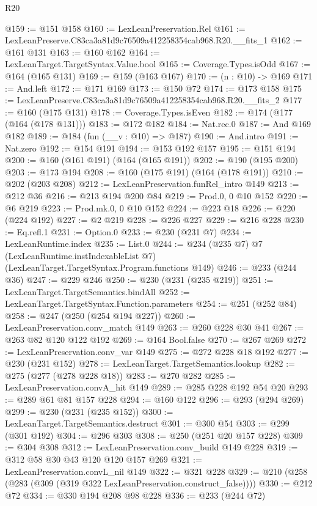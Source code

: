 \begin{lexlean}{R20}
\begin{coremodule}
@159 := @151 @158
@160 := LexLeanPreservation.Rel
@161 := LexLeanPreserve.C83ca3a81d9c76509a412258354cab968.R20.__fits_1
@162 := @161 @131
@163 := @160 @162
@164 := LexLeanTarget.TargetSyntax.Value.bool
@165 := Coverage.Types.isOdd
@167 := @164 (@165 @131)
@169 := @159 (@163 @167)
@170 := (n : @10) -> @169
@171 := And.left
@172 := @171 @169
@173 := @150 @72
@174 := @173 @158
@175 := LexLeanPreserve.C83ca3a81d9c76509a412258354cab968.R20.__fits_2
@177 := @160 (@175 @131)
@178 := Coverage.Types.isEven
@182 := @174 (@177 (@164 (@178 @131)))
@183 := @172 @182
@184 := Nat.rec.{0}
@187 := And @169 @182
@189 := @184 (fun (__v : @10) => @187)
@190 := And.intro
@191 := Nat.zero
@192 := @154 @191
@194 := @153 @192 @157
@195 := @151 @194
@200 := @160 (@161 @191) (@164 (@165 @191))
@202 := @190 (@195 @200)
@203 := @173 @194
@208 := @160 (@175 @191) (@164 (@178 @191))
@210 := @202 (@203 @208)
@212 := LexLeanPreservation.funRel_intro @149
@213 := @212 @36
@216 := @213 @194 @200 @84
@219 := Prod.{0, 0} @10 @152
@220 := @6 @219
@223 := Prod.mk.{0, 0} @10 @152
@224 := @223 @18
@226 := @220 (@224 @192)
@227 := @2 @219
@228 := @226 @227
@229 := @216 @228
@230 := Eq.refl.{1}
@231 := Option.{0}
@233 := @230 (@231 @7)
@234 := LexLeanRuntime.index
@235 := List.{0}
@244 := @234
    (@235 @7)
    @7
    (LexLeanRuntime.instIndexableList @7)
    (LexLeanTarget.TargetSyntax.Program.functions @149)
@246 := @233 (@244 @36)
@247 := @229 @246
@250 := @230 (@231 (@235 @219))
@251 := LexLeanTarget.TargetSemantics.bindAll
@252 := LexLeanTarget.TargetSyntax.Function.parameters
@254 := @251 (@252 @84)
@258 := @247 (@250 (@254 @194 @227))
@260 := LexLeanPreservation.conv_match @149
@263 := @260 @228 @30 @41
@267 := @263 @82 @120 @122 @192
@269 := @164 Bool.false
@270 := @267 @269
@272 := LexLeanPreservation.conv_var @149
@275 := @272 @228 @18 @192
@277 := @230 (@231 @152)
@278 := LexLeanTarget.TargetSemantics.lookup
@282 := @275 (@277 (@278 @228 @18))
@283 := @270 @282
@285 := LexLeanPreservation.convA_hit @149
@289 := @285 @228 @192 @54 @20
@293 := @289 @61 @81 @157 @228
@294 := @160 @122
@296 := @293 (@294 @269)
@299 := @230 (@231 (@235 @152))
@300 := LexLeanTarget.TargetSemantics.destruct
@301 := @300 @54
@303 := @299 (@301 @192)
@304 := @296 @303
@308 := @250 (@251 @20 @157 @228)
@309 := @304 @308
@312 := LexLeanPreservation.conv_build @149 @228
@319 := @312 @58 @30 @43 @120 @120 @157 @269
@321 := LexLeanPreservation.convL_nil @149
@322 := @321 @228
@329 := @210 (@258 (@283 (@309 (@319 @322 LexLeanPreservation.construct_false))))
@330 := @212 @72
@334 := @330 @194 @208 @98 @228
@336 := @233 (@244 @72)

\end{coremodule}
\end{lexlean}
